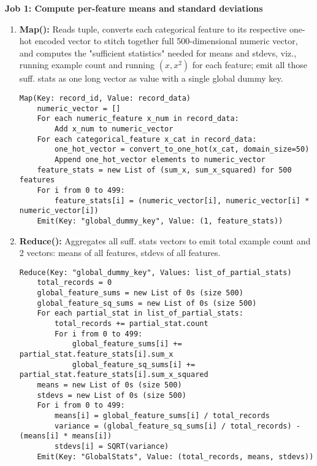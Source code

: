 \documentclass{article}
\begin{document}
\begin{enumerate}[label=\textbf{Question \arabic*.}]
    \textbf{Job 1: Compute per-feature means and standard deviations}
    \begin{enumerate}[label=(\alph*)]
    \item \textbf{Map():} Reads tuple, converts each categorical feature to its respective one-hot encoded vector to stitch together full 500-dimensional numeric vector, and computes the "sufficient statistics" needed for means and stdevs, viz., running example count and running $(x, x^2)$ for each feature; emit all those suff. stats as one long vector as value with a single global dummy key.
        \begin{lstlisting}
Map(Key: record_id, Value: record_data)
    numeric_vector = []
    For each numeric_feature x_num in record_data:
        Add x_num to numeric_vector
    For each categorical_feature x_cat in record_data:
        one_hot_vector = convert_to_one_hot(x_cat, domain_size=50)
        Append one_hot_vector elements to numeric_vector
    feature_stats = new List of (sum_x, sum_x_squared) for 500 features
    For i from 0 to 499:
        feature_stats[i] = (numeric_vector[i], numeric_vector[i] * numeric_vector[i])
    Emit(Key: "global_dummy_key", Value: (1, feature_stats))
        \end{lstlisting}
    \item \textbf{Reduce():} Aggregates all suff. stats vectors to emit total example count and 2 vectors: means of all features, stdevs of all features.
        \begin{lstlisting}
Reduce(Key: "global_dummy_key", Values: list_of_partial_stats)
    total_records = 0
    global_feature_sums = new List of 0s (size 500)
    global_feature_sq_sums = new List of 0s (size 500)
    For each partial_stat in list_of_partial_stats:
        total_records += partial_stat.count
        For i from 0 to 499:
            global_feature_sums[i] += partial_stat.feature_stats[i].sum_x
            global_feature_sq_sums[i] += partial_stat.feature_stats[i].sum_x_squared
    means = new List of 0s (size 500)
    stdevs = new List of 0s (size 500)
    For i from 0 to 499:
        means[i] = global_feature_sums[i] / total_records
        variance = (global_feature_sq_sums[i] / total_records) - (means[i] * means[i])
        stdevs[i] = SQRT(variance)
    Emit(Key: "GlobalStats", Value: (total_records, means, stdevs))
        \end{lstlisting}
    \end{enumerate}


\end{enumerate}
\end{document}

